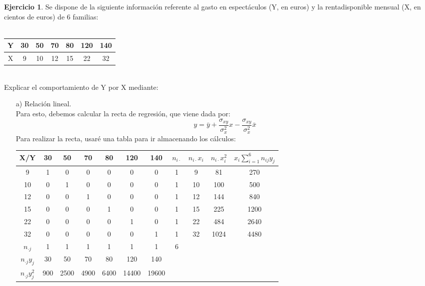 \documentclass[a4paper, 12pt]{article}
\theoremstyle{definition}
\newtheorem{ej}{Ejercicio}
\begin{document}
\begin{ej}
Se dispone de la siguiente información referente al gasto en espectáculos (Y, en euros) y la rentadisponible mensual (X, en cientos de euros) de 6 familias: \\ \\
\centering
\begin{tabular}{c|cccccc}
    Y & 30 & 50 & 70 & 80 & 120 & 140\\ \hline
    X & 9 & 10 & 12 & 15 & 22 & 32
\end{tabular} \\
Explicar el comportamiento de Y por X mediante: \\
\begin{enumerate}
    \item[a) ] Relación lineal. \\
    Para esto, debemos calcular la recta de regresión, que viene dada por:
    $$y = \bar{y} + \frac{\sigma_{xy}}{\sigma_x^2}x - \frac{\sigma_{xy}}{\sigma_x^2}\bar{x}$$
    Para realizar la recta, usaré una tabla para ir almacenando los cálculos: \\
    \begin{tabular}{c|cccccc|cccc}
    X/Y & 30 & 50 & 70 & 80 & 120 & 140 & $n_{i \cdot}$ & $n_{i \cdot} x_i$ &  $n_{i \cdot} x_i^2$ & $x_i \displaystyle \sum_{i = 1}^6 n_{ij} y_j$\\
    \hline
    9 & 1 & 0 & 0 & 0 & 0 & 0 & 1 & 9 & 81 & 270 \\
    10 & 0 & 1 & 0 & 0 & 0 & 0 & 1 & 10 & 100 & 500 \\
    12 & 0 & 0 & 1 & 0 & 0 & 0 & 1 & 12& 144 & 840 \\
    15 & 0 & 0 & 0 & 1 & 0 & 0 & 1 & 15 & 225 & 1200 \\
    22 & 0 & 0 & 0 & 0 & 1 & 0 & 1 & 22 & 484 & 2640 \\
    32 & 0 & 0 & 0 & 0 & 0 & 1 & 1 & 32 & 1024 & 4480 \\
    \hline
    $n_{\cdot j}$ & 1 & 1 & 1 & 1 & 1 & 1 & 6 & & & \vline 9930 \vline \\
    $n_{\cdot j} y_j$ & 30 & 50 & 70 & 80 & 120 & 140 & & & &\\
    $n_{\cdot j} y_j^2$ & 900 & 2500 & 4900 & 6400 & 14400 & 19600
    \end{tabular}
    

\end{enumerate}
\end{ej}
\end{document}
